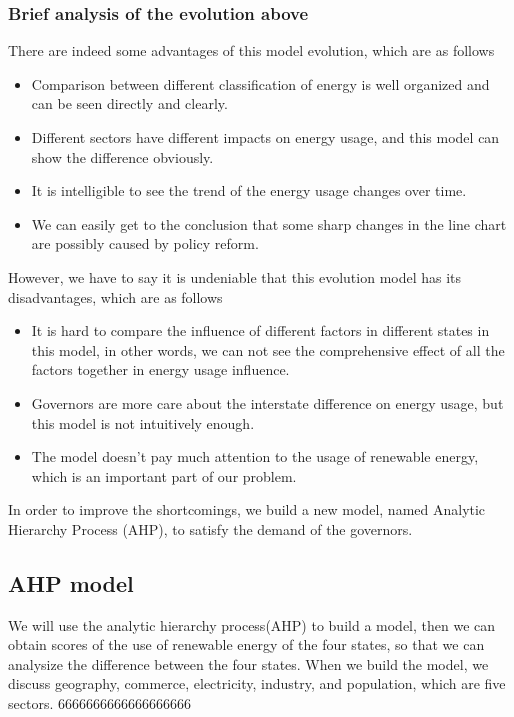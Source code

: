 \documentclass[a4paper,11pt]{article}
\begin{document}
\subsubsection{Brief analysis of the evolution above}
\par There are indeed some advantages of this model evolution, which are as follows
\begin{itemize}
    \item Comparison between different classification of energy is well organized and can be seen directly and clearly.
    \item Different sectors have different impacts on energy usage, and this model can show the difference obviously.
    \item It is intelligible to see the trend of the energy usage changes over time.
    \item We can easily get to the conclusion that some sharp changes in the line chart are possibly caused by policy reform.  
\end{itemize}
\par However, we have to say it is undeniable that this evolution model has its disadvantages, which are as follows
\begin{itemize}
    \item It is hard to compare the influence of different factors in different states in this model, in other words, we can not see the comprehensive effect of all the factors together in energy usage influence.
    \item Governors are more care about the interstate difference on energy usage, but this model is not intuitively enough.
    \item The model doesn't pay much attention to the usage of renewable energy, which is an important part of our problem.
\end{itemize}
\par In order to improve the shortcomings, we build a new model, named Analytic Hierarchy Process (AHP), to satisfy the demand of the governors.


\subsection{AHP model}
\par We will use the analytic hierarchy process(AHP) to build a model, then we can obtain scores of the use of renewable energy of the four states, so that we can analysize the difference between the four states. When we build the model, we discuss geography, commerce, electricity, industry, and population, which are five sectors. 6666666666666666666 
\end{document}
